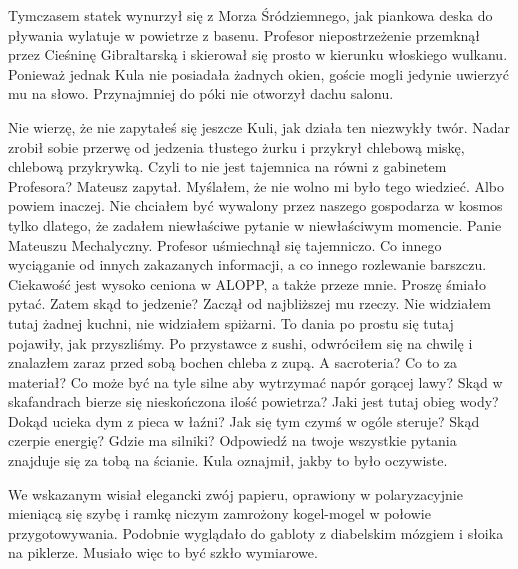 Tymczasem statek wynurzył się z Morza Śródziemnego, jak piankowa deska do pływania wylatuje w powietrze z basenu. 
Profesor niepostrzeżenie przemknął przez Cieśninę Gibraltarską i skierował się prosto w kierunku włoskiego wulkanu.
Ponieważ jednak Kula nie posiadała żadnych okien, goście mogli jedynie uwierzyć mu na słowo. Przynajmniej do póki nie otworzył dachu salonu.

\begin{dialogue}
\ds{} Nie wierzę, że nie zapytałeś się jeszcze Kuli, jak działa ten niezwykły twór. \dm{} Nadar zrobił sobie przerwę od jedzenia 
tłustego żurku i przykrył chlebową miskę, chlebową przykrywką.
\ds{} Czyli to nie jest tajemnica na równi z gabinetem Profesora? \dm{} Mateusz zapytał. \dm{} Myślałem, że nie wolno mi było tego wiedzieć.
Albo powiem inaczej. Nie chciałem być wywalony przez naszego gospodarza w kosmos tylko dlatego, że zadałem niewłaściwe pytanie w niewłaściwym momencie.
\ds{} Panie Mateuszu Mechalyczny. \dm{} Profesor uśmiechnął się tajemniczo. \dm{} Co innego wyciąganie od innych zakazanych informacji, a co innego rozlewanie barszczu. 
Ciekawość jest wysoko ceniona w ALOPP, a także przeze mnie. Proszę śmiało pytać.
\ds{} Zatem skąd to jedzenie? \dm{} Zaczął od najbliższej mu rzeczy. \dm{} Nie widziałem tutaj żadnej kuchni, nie widziałem spiżarni.
To dania po prostu się tutaj pojawiły, jak przyszliśmy. Po przystawce z sushi, odwróciłem się na chwilę i znalazłem zaraz przed sobą bochen chleba z zupą.
A sacroteria? Co to za materiał? Co może być na tyle silne aby wytrzymać napór gorącej lawy? 
Skąd w skafandrach bierze się nieskończona ilość powietrza? Jaki jest tutaj obieg wody? 
Dokąd ucieka dym z pieca w łaźni? Jak się tym czymś w ogóle steruje? Skąd czerpie energię? Gdzie ma silniki?
\ds{} Odpowiedź na twoje wszystkie pytania znajduje się za tobą na ścianie. \dm{} Kula oznajmił, jakby to było oczywiste.
\end{dialogue}

We wskazanym wisiał elegancki zwój papieru, oprawiony w polaryzacyjnie mieniącą się szybę i ramkę niczym zamrożony kogel-mogel w połowie przygotowywania.
Podobnie wyglądało do gabloty z diabelskim mózgiem i słoika na piklerze. Musiało więc to być szkło wymiarowe.


